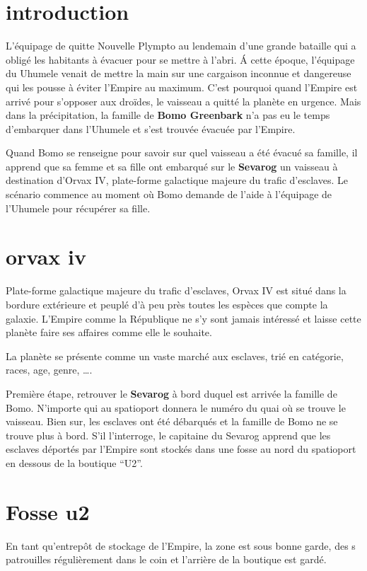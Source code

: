 \documentclass{jdrp}
\begin{document}
	\twocolumn

	\section{introduction}
	L’équipage de  quitte Nouvelle Plympto au lendemain d’une grande bataille qui a obligé les habitants à évacuer pour se mettre à l’abri. \'A cette époque, l’équipage du Uhumele venait de mettre la main sur une cargaison inconnue et dangereuse qui les pousse à éviter l’Empire au maximum. C’est pourquoi quand l’Empire est arrivé pour s’opposer aux droïdes, le vaisseau a quitté la planète en urgence. Mais dans la précipitation, la famille de \textbf{Bomo Greenbark} n’a pas eu le temps d’embarquer dans l’Uhumele et s’est trouvée évacuée par l’Empire.

	Quand Bomo se renseigne pour savoir sur quel vaisseau a été évacué sa famille, il apprend que sa femme et sa fille ont embarqué sur le \textbf{Sevarog} un vaisseau à destination d’Orvax IV, plate-forme galactique majeure du trafic d’esclaves. Le scénario commence au moment où Bomo demande de l’aide à l’équipage de l’Uhumele pour récupérer sa fille.

	\section{orvax iv}
	Plate-forme galactique majeure du trafic d’esclaves, Orvax IV est situé dans la bordure extérieure et peuplé d’à peu près toutes les espèces que compte la galaxie. L’Empire comme la République ne s’y sont jamais intéressé et laisse cette planète faire ses affaires comme elle le souhaite.

	La planète se présente comme un vaste marché aux esclaves, trié en catégorie, races, age, genre, \ldots.

	Première étape, retrouver le \textbf{Sevarog} à bord duquel est arrivée la famille de Bomo. N’importe qui au spatioport donnera le numéro du quai où se trouve le vaisseau. Bien sur, les esclaves ont été débarqués et la famille de Bomo ne se trouve plus à bord. S’il l'interroge, le capitaine du Sevarog apprend que les esclaves déportés par l’Empire sont stockés dans une fosse au nord du spatioport en dessous de la boutique “U2”.

	\section{Fosse u2}
	En tant qu’entrepôt de stockage de l’Empire, la zone est sous bonne garde, des s patrouilles régulièrement dans le coin et l’arrière de la boutique est gardé.
\end{document}
